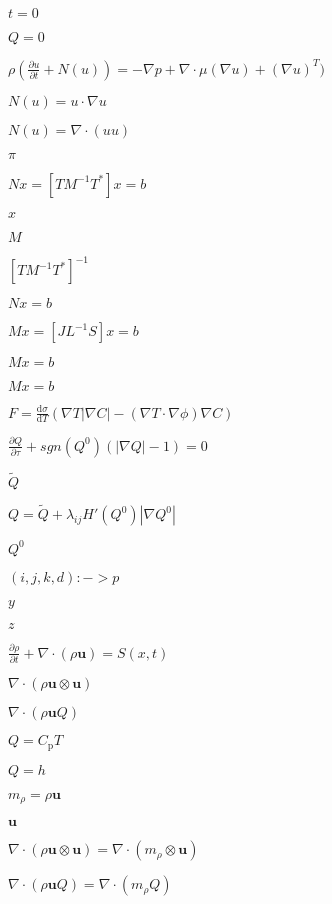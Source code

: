 \documentclass{article}
\begin{document}
$ t = 0 $
\pagebreak

$ Q = 0 $
\pagebreak

$\rho(\frac{\partial u}{\partial t} + N(u)) = -\nabla p + \nabla \cdot \mu (\nabla u) + (\nabla u)^T )$
\pagebreak

$ N(u) = u \cdot \nabla u $
\pagebreak

$ N(u) = \nabla \cdot (u u) $
\pagebreak

$ \pi $
\pagebreak

$ Nx = [T M^{-1} T^{*}]x = b $
\pagebreak

$ x $
\pagebreak

$ M $
\pagebreak

$ [T M^{-1} T^{*}]^{-1} $
\pagebreak

$ Nx = b $
\pagebreak

$ Mx = [J L^{-1} S]x = b $
\pagebreak

$ Mx=b $
\pagebreak

$ Mx = b $
\pagebreak

$ F = \frac{\mathrm{d} \sigma}{\mathrm{d} T}(\nabla T |\nabla C| - (\nabla T \cdot \nabla \phi) \nabla C)$
\pagebreak

$\frac{\partial Q}{\partial \tau}+sgn(Q^0)(|\nabla Q | - 1) = 0$
\pagebreak

$\tilde{Q}$
\pagebreak

$Q = \tilde{Q} + \lambda_{ij}H'(Q^0)|\nabla Q^0|$
\pagebreak

$Q^0$
\pagebreak

$ (i,j,k,d):-> p $
\pagebreak

$ y $
\pagebreak

$ z $
\pagebreak

$ \frac{\partial \rho}{\partial t} + \nabla \cdot (\rho \mathbf{u}) = S(x,t) $
\pagebreak

$ \nabla \cdot (\rho \mathbf{u} \otimes \mathbf{u})$
\pagebreak

$ \nabla \cdot (\rho \mathbf{u} Q)$
\pagebreak

$ Q = C_\textrm{p} T$
\pagebreak

$ Q = h$
\pagebreak

$ m_\rho = \rho \mathbf{u} $
\pagebreak

$ \mathbf{u} $
\pagebreak

$ \nabla \cdot (\rho \mathbf{u} \otimes \mathbf{u}) = \nabla \cdot (m_\rho \otimes \mathbf{u} ) $
\pagebreak

$ \nabla \cdot (\rho \mathbf{u} Q) = \nabla \cdot (m_\rho Q) $
\pagebreak
\end{document}
